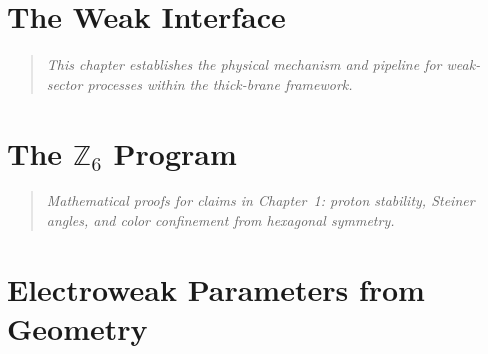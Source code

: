\documentclass[11pt,a4paper]{book}
\theoremstyle{definition}
\theoremstyle{remark}
\begin{document}
\mainmatter

\chapter{The Weak Interface}
\label{ch:weak_interface}

\begin{quote}
\textit{This chapter establishes the physical mechanism and pipeline for weak-sector
processes within the thick-brane framework.}
\end{quote}

















\chapter{The $\mathbb{Z}_6$ Program}
\label{ch:z6_program}

\begin{quote}
\textit{Mathematical proofs for claims in Chapter~1: proton stability, Steiner angles,
and color confinement from hexagonal symmetry.}
\end{quote}



\chapter{Electroweak Parameters from Geometry}
\label{ch:electroweak}
\end{document}

